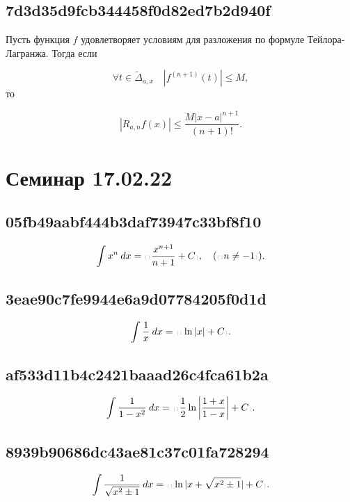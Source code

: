 \documentclass[11pt, a5paper]{article}
\let\oldsection\section
\renewcommand\section{\pagebreak\oldsection}
\newenvironment{note}[1]{\goodbreak\par\subsection{\hfill \color{lightgray}\tiny #1}}{}
\newenvironment{icloze}[2][\ldots]{%
  \ignorespaces\text{\tiny \color{lightgray}\{#2} %
}{%
  \text{\tiny\color{lightgray}\}}\unskip%
}
\begin{document}
\begin{note}{7d3d35d9fcb344458f0d82ed7b2d940f}
    Пусть \begin{icloze}{3}функция \( f \) удовлетворяет условиям для разложения по формуле Тейлора-Лагранжа.\end{icloze}
    Тогда если
    \begin{icloze}{2}
        \[
            \forall t \in \widetilde \Delta _{a, x} \quad |f^{(n + 1)} (t)| \leqslant M,
        \]
    \end{icloze}
    то
    \begin{icloze}{1}
        \[
            |R_{a, n} f(x)| \leqslant \frac{M|x - a|^{n + 1} }{(n + 1)! }.
        \]
    \end{icloze}
\end{note}

\section{Семинар 17.02.22}
\begin{note}{05fb49aabf444b3daf73947c33bf8f10}
    \[
        \int x^{n} \: dx = \begin{icloze}{1}\frac{x^{n+1} }{n + 1} + C\end{icloze}, \quad (\begin{icloze}{2}n \neq -1\end{icloze}).
    \]
\end{note}

\begin{note}{3eae90c7fe9944e6a9d07784205f0d1d}
    \[
        \int \frac{1}{x} \: dx = \begin{icloze}{1}\ln |x| + C\end{icloze}.
    \]
\end{note}

\begin{note}{af533d11b4c2421baaad26c4fca61b2a}
    \[
        \int \frac{1}{1 - x^2 } \: dx = \begin{icloze}{1}\frac{1}{2} \ln\left|\frac{1 + x}{1 - x}\right| + C\end{icloze}.
    \]
\end{note}

\begin{note}{8939b90686dc43ae81c37c01fa728294}
    \[
        \int \frac{1}{\sqrt{x^2 \pm 1} } \: dx = \begin{icloze}{1}\ln |x + \sqrt{x^2 \pm 1}| + C\end{icloze}.
    \]
\end{note}
\end{document}
